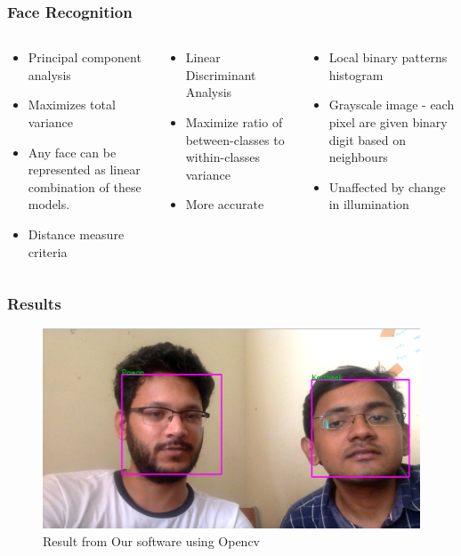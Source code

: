 \documentclass[aspectratio=149]{beamer}
\begin{document}
\begin{frame}
\frametitle{Face Recognition}
\begin{columns}
	\begin{column}{.35\textwidth}
		\begin{itemize}
			\item Principal component analysis
			\item Maximizes total variance
			\item Any face can be represented as linear combination of these models.
			\item Distance measure criteria
		\end{itemize}
	\end{column}
	\begin{column}{.35\textwidth}
		\begin{itemize}
			\item Linear Discriminant Analysis 
			\item Maximize ratio of between-classes to within-classes variance
			\item More accurate
		\end{itemize}
	\end{column}
	\begin{column}{.35\textwidth}
		\begin{itemize}
			\item Local binary patterns histogram
			\item Grayscale image - each pixel are given binary digit based on neighbours 
			\item Unaffected by change in illumination
		\end{itemize}
	\end{column}
\end{columns} 

\end{frame}


\begin{frame}
\frametitle{Results}
\begin{figure}
	\centering
	\includegraphics[scale=0.25]{./images/res.png}
	\caption{Result from Our software using Opencv}
\end{figure}
\end{frame}
\end{document}

